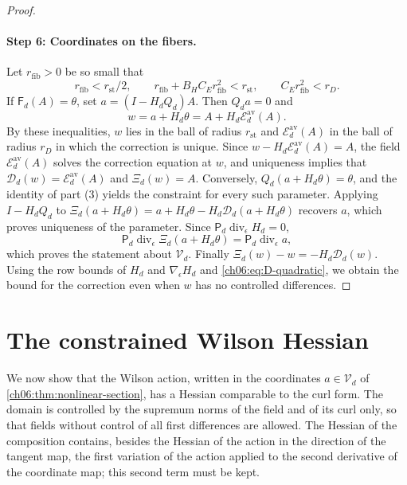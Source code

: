 \begin{proof}
\paragraph{Step 6: Coordinates on the fibers.}
Let $r_{\mathrm{fib}}>0$ be so small that
\[
 r_{\mathrm{fib}}<r_{\mathrm{st}}/2,\qquad r_{\mathrm{fib}}+B_HC_Er_{\mathrm{fib}}^2<r_{\mathrm{st}},\qquad C_Er_{\mathrm{fib}}^2<r_D.
\]
If $\mathsf F_d(A)=\theta$, set $a=(I-H_dQ_d)A$. Then $Q_da=0$ and
\[
 w=a+H_d\theta=A+H_d\mathscr E_d^{\mathrm{av}}(A).
\]
By these inequalities, $w$ lies in the ball of radius $r_{\mathrm{st}}$ and $\mathscr E_d^{\mathrm{av}}(A)$ in the ball of radius $r_D$ in which the correction is unique. Since $w-H_d\mathscr E_d^{\mathrm{av}}(A)=A$, the field $\mathscr E_d^{\mathrm{av}}(A)$ solves the correction equation at $w$, and uniqueness implies that $\mathscr D_d(w)=\mathscr E_d^{\mathrm{av}}(A)$ and $\Xi_d(w)=A$. Conversely, $Q_d(a+H_d\theta)=\theta$, and the identity of part (3) yields the constraint for every such parameter. Applying $I-H_dQ_d$ to $\Xi_d(a+H_d\theta)=a+H_d\theta-H_d\mathscr D_d(a+H_d\theta)$ recovers $a$, which proves uniqueness of the parameter. Since $\mathsf P_d\operatorname{div}_\epsilon H_d=0$,
\[
 \mathsf P_d\operatorname{div}_\epsilon\Xi_d(a+H_d\theta)=\mathsf P_d\operatorname{div}_\epsilon a,
\]
which proves the statement about $\mathcal V_d$. Finally $\Xi_d(w)-w=-H_d\mathscr D_d(w)$. Using the row bounds of $H_d$ and $\nabla_\epsilon H_d$ and \eqref{ch06:eq:D-quadratic}, we obtain the bound for the correction even when $w$ has no controlled differences.
\end{proof}

\section{The constrained Wilson Hessian}\label{ch06:sec:hessian}

We now show that the Wilson action, written in the coordinates $a\in\mathcal V_d$ of \cref{ch06:thm:nonlinear-section}, has a Hessian comparable to the curl form. The domain is controlled by the supremum norms of the field and of its curl only, so that fields without control of all first differences are allowed. The Hessian of the composition contains, besides the Hessian of the action in the direction of the tangent map, the first variation of the action applied to the second derivative of the coordinate map; this second term must be kept.

